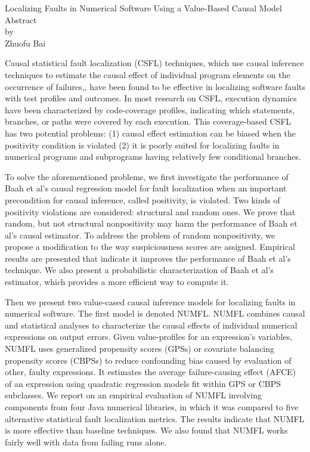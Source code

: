 \newpage
\begin{centering}
  Localizing Faults in Numerical Software Using a Value-Based Causal Model
  \\
  \vspace{1cm}
  Abstract\\
  by\\
  \vspace{1cm}
  Zhuofu Bai\\
  \vspace{1cm}
\end{centering}



Causal statistical fault localization (CSFL) techniques,  which use causal inference techniques to  estimate the causal effect of individual program elements on the occurrence of failures,, have been found to be effective in localizing software faults with test profiles and outcomes. In most research on CSFL, execution dynamics have been characterized by code-coverage profiles, indicating which statements, branches, or paths were covered by each execution. This coverage-based CSFL has two potential problems: (1) causal effect estimation can be biased when the positivity condition is violated  (2) it is poorly suited for localizing faults in numerical programs and subprograms having relatively few conditional branches. 

To solve the aforementioned problems, we first investigate the performance of Baah et al’s causal regression model for fault localization when an important precondition for causal inference, called positivity, is violated.  Two kinds of positivity violations are considered: structural and random ones.  We prove that random, but not structural nonpositivity may harm the performance of Baah et al’s causal estimator.  To address the problem of random nonpositivity, we propose a modification to the way suspiciousness scores are assigned.  Empirical results are presented that indicate it improves the performance of Baah et al’s technique. We also present a probabilistic characterization of Baah et al’s estimator, which provides a more efficient way to compute it.

Then we present two value-cased causal inference models for localizing faults in numerical software. The first model is denoted NUMFL. NUMFL combines causal and statistical analyses to characterize the causal effects of individual numerical expressions on output errors.  Given value-profiles for an expression’s variables, NUMFL uses generalized propensity scores (GPSs) or covariate balancing propensity scores (CBPSs) to reduce confounding bias caused by evaluation of other, faulty expressions.  It estimates the average failure-causing effect (AFCE) of an expression using quadratic regression models fit within GPS or CBPS subclasses.  We report on an empirical evaluation of NUMFL involving components from four Java numerical libraries, in which it was compared to five alternative statistical fault localization metrics.  The results indicate that NUMFL is more effective than baseline techniques. We also found that NUMFL works fairly well with data from failing runs alone. 

